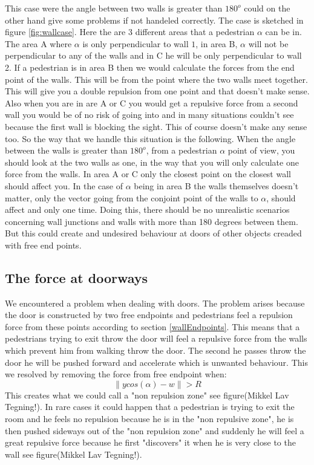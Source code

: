This case were the angle between two walls is greater than $180^o$ could on the other hand give some problems if not handeled correctly. The case is sketched in figure \ref{fig:wallcase}. Here the are 3 different areas that a pedestrian $\alpha$ can be in. The area A where $\alpha$ is only perpendicular to wall $1$, in area B, $\alpha$ will not be perpendicular to any of the walls and in C he will be only perpendicular to wall 2. If a pedestrian is in area B then we would calculate the forces from the end point of the walls. This will be from the point where the two walls meet together. This will give you a double repulsion from one point and that doesn't make sense. Also when you are in are A or C you would get a repulsive force from a second wall you would be of no risk of going into and in many situations couldn't see because the first wall is blocking the sight. This of course doesn't make any sense too. So the way that we handle this situation is the following. When the angle between the walls is greater than $180^o$, from a pedestrian $\alpha$ point of view, you should look at the two walls as one, in the way that you will only calculate one force from the walls. In area A or C only the closest point on the closest wall should affect you. In the case of $\alpha$ being in area B the walls themselves doesn't matter, only the vector going from the conjoint point of the walls to $\alpha$, should affect and only one time. Doing this, there should be no unrealistic scenarios concerning wall junctions and walls with more than 180 degrees between them. But this could create and undesired behaviour at doors of other objects creaded with free end points.
\subsection{The force at doorways}
We encountered a problem when dealing with doors. The problem arises because the door is constructed by two free endpoints and pedestrians feel a repulsion force from these points according to section \ref{wallEndpoints}. This means that a pedestrians trying to exit throw the door will feel a repulsive force from the walls which prevent him from walking throw the door. The second he passes throw the door he will be pushed forward and accelerate which is unwanted behaviour. This we resolved by removing the force from free endpoint when:
\begin{equation}
\| y cos(\alpha) - w \| > R
\end{equation}
This creates what we could call a "non repulsion zone" see figure(Mikkel Lav Tegning!).
In rare cases it could happen that a pedestrian is trying to exit the room and he feels no repulsion because he is in the "non repulsive zone", he is then pushed sideways out of the "non repulsion zone" and suddenly he will feel a great repulsive force because he first "discovers" it when he is very close to the wall see figure(Mikkel Lav Tegning!).

